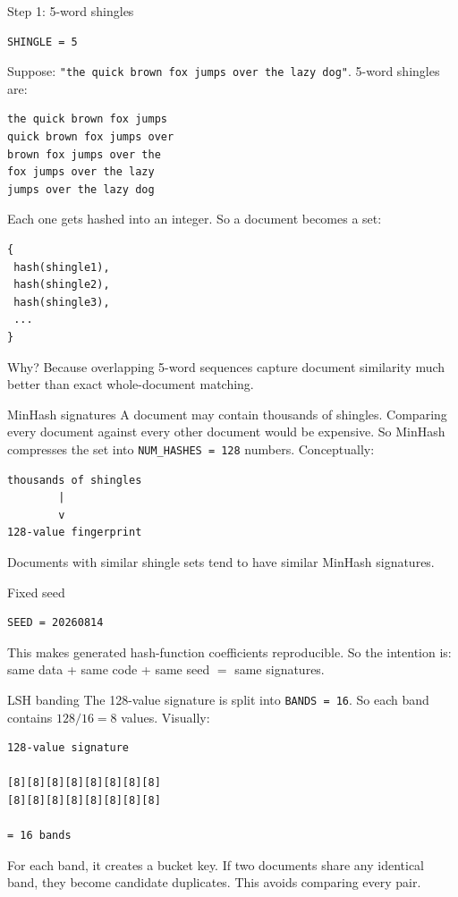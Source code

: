 \begin{paragraphblock}{Step 1: 5-word shingles}
\begin{lstlisting}[style=shadedpython]
SHINGLE = 5
\end{lstlisting}
  Suppose: \texttt{"the quick brown fox jumps over the lazy dog"}. 5-word
  shingles are:
\begin{lstlisting}[style=shadedpython,language={},basicstyle=\scriptsize\ttfamily]
the quick brown fox jumps
quick brown fox jumps over
brown fox jumps over the
fox jumps over the lazy
jumps over the lazy dog
\end{lstlisting}
  Each one gets hashed into an integer. So a document becomes a set:
\begin{lstlisting}[style=shadedpython]
{
 hash(shingle1),
 hash(shingle2),
 hash(shingle3),
 ...
}
\end{lstlisting}
  Why? Because overlapping 5-word sequences capture document similarity much
  better than exact whole-document matching.
\end{paragraphblock}

\begin{paragraphblock}{MinHash signatures}
  A document may contain thousands of shingles. Comparing every document
  against every other document would be expensive. So MinHash compresses the
  set into \texttt{NUM\_HASHES = 128} numbers. Conceptually:
\begin{lstlisting}[style=shadedpython,language={},basicstyle=\scriptsize\ttfamily]
thousands of shingles
        |
        v
128-value fingerprint
\end{lstlisting}
  Documents with similar shingle sets tend to have similar MinHash signatures.
\end{paragraphblock}

\begin{paragraphblock}{Fixed seed}
\begin{lstlisting}[style=shadedpython]
SEED = 20260814
\end{lstlisting}
  This makes generated hash-function coefficients reproducible. So the
  intention is: same data + same code + same seed $=$ same signatures.
\end{paragraphblock}

\begin{paragraphblock}{LSH banding}
  The 128-value signature is split into \texttt{BANDS = 16}. So each band
  contains $128 / 16 = 8$ values. Visually:
\begin{lstlisting}[style=shadedpython,language={},basicstyle=\scriptsize\ttfamily]
128-value signature

[8][8][8][8][8][8][8][8]
[8][8][8][8][8][8][8][8]

= 16 bands
\end{lstlisting}
  For each band, it creates a bucket key. If two documents share any identical
  band, they become candidate duplicates. This avoids comparing every pair.
\end{paragraphblock}

